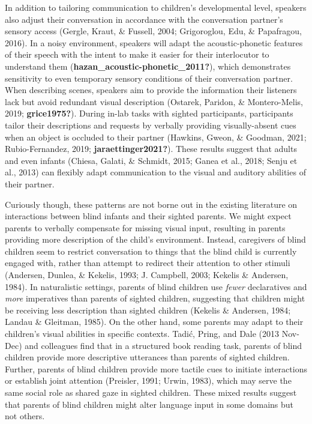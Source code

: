 \documentclass[
  man,floatsintext]{apa6}
\begin{document}
In addition to tailoring communication to children's developmental level, speakers also adjust their conversation in accordance with the conversation partner's sensory access (Gergle, Kraut, \& Fussell, 2004; Grigoroglou, Edu, \& Papafragou, 2016). In a noisy environment, speakers will adapt the acoustic-phonetic features of their speech with the intent to make it easier for their interlocutor to understand them (\textbf{hazan\_acoustic-phonetic\_2011?}), which demonstrates sensitivity to even temporary sensory conditions of their conversation partner. When describing scenes, speakers aim to provide the information their listeners lack but avoid redundant visual description (Ostarek, Paridon, \& Montero-Melis, 2019; \textbf{grice1975?}). During in-lab tasks with sighted participants, participants tailor their descriptions and requests by verbally providing visually-absent cues when an object is occluded to their partner (Hawkins, Gweon, \& Goodman, 2021; Rubio-Fernandez, 2019; \textbf{jaraettinger2021?}). These results suggest that adults and even infants (Chiesa, Galati, \& Schmidt, 2015; Ganea et al., 2018; Senju et al., 2013) can flexibly adapt communication to the visual and auditory abilities of their partner.

Curiously though, these patterns are not borne out in the existing literature on interactions between blind infants and their sighted parents. We might expect parents to verbally compensate for missing visual input, resulting in parents providing more description of the child's environment. Instead, caregivers of blind children seem to restrict conversation to things that the blind child is currently engaged with, rather than attempt to redirect their attention to other stimuli (Andersen, Dunlea, \& Kekelis, 1993; J. Campbell, 2003; Kekelis \& Andersen, 1984). In naturalistic settings, parents of blind children use \emph{fewer} declaratives and \emph{more} imperatives than parents of sighted children, suggesting that children might be receiving less description than sighted children (Kekelis \& Andersen, 1984; Landau \& Gleitman, 1985). On the other hand, some parents may adapt to their children's visual abilities in specific contexts. Tadić, Pring, and Dale (2013 Nov-Dec) and colleagues find that in a structured book reading task, parents of blind children provide more descriptive utterances than parents of sighted children. Further, parents of blind children provide more tactile cues to initiate interactions or establish joint attention (Preisler, 1991; Urwin, 1983), which may serve the same social role as shared gaze in sighted children. These mixed results suggest that parents of blind children might alter language input in some domains but not others.
\end{document}
